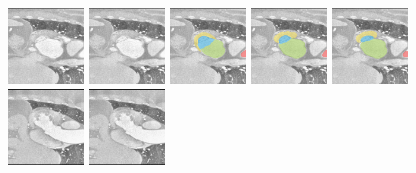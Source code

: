 \begin{figure}[h!] %
    \includegraphics[width=0.18\textwidth]{image/chap04/seg/1_125input_ct.png}
    \includegraphics[width=0.18\textwidth]{image/chap04/seg/1_125lower.png}
    \includegraphics[width=0.18\textwidth]{image/chap04/seg/1_125pred.png}
    \includegraphics[width=0.18\textwidth]{image/chap04/seg/1_125upper.png}
    \includegraphics[width=0.18\textwidth]{image/chap04/seg/1_125gt.png}
    \\
    \includegraphics[width=0.18\textwidth]{image/chap04/seg/1_150input_ct.png}
    \includegraphics[width=0.18\textwidth]{image/chap04/seg/1_150lower.png}

\end{figure}
